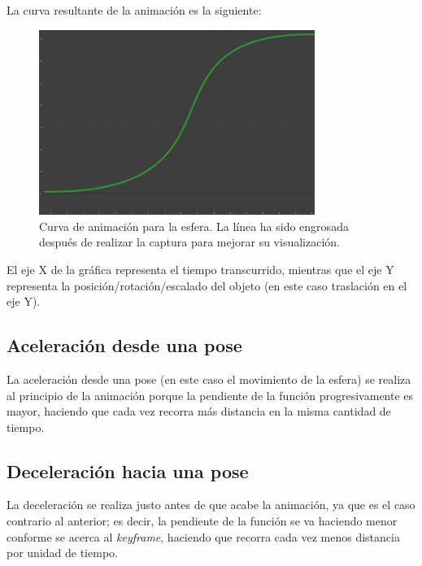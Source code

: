 \documentclass{article}
\begin{document}
\bigskip

La curva resultante de la animación es la siguiente:

\begin{figure}[H]
    \centering
    \includegraphics[width=0.8\textwidth]{imagenes/curva.png}
    \caption{Curva de animación para la esfera. La línea ha sido engrosada después de realizar la captura para mejorar su visualización.}
\end{figure}

El eje X de la gráfica representa el tiempo transcurrido, mientras que el eje Y representa la posición/rotación/escalado del objeto (en este caso traslación en el eje Y).

\subsection{Aceleración desde una pose}
La aceleración desde una pose (en este caso el movimiento de la esfera) se realiza al principio de la animación porque la pendiente de la función progresivamente es mayor, haciendo que cada vez recorra más distancia en la misma cantidad de tiempo.
\subsection{Deceleración hacia una pose}

La deceleración se realiza justo antes de que acabe la animación, ya que es el caso contrario al anterior; es decir, la pendiente de la función se va haciendo menor conforme se acerca al \textit{keyframe}, haciendo que recorra cada vez menos distancia por unidad de tiempo.

\newpage
\end{document}
